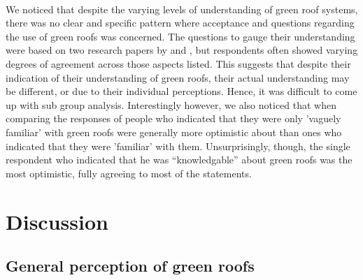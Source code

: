 \documentclass{article}
\begin{document}
\begin{multicols}{2}
  \paragraph{} We noticed that despite the varying levels of understanding
  of green roof systems, there was no clear and specific pattern
  where acceptance and questions regarding the use of green roofs was
  concerned. The questions to gauge their understanding were based on
  two research papers by \cite{HKGreenRoofGL} and \cite{energeff},
  but respondents often showed varying degrees of agreement across
  those aspects listed. This suggests that despite their indication of
  their understanding of green roofs, their actual understanding may
  be different, or due to their individual perceptions. Hence, it was
  difficult to come up with sub group analysis.  Interestingly however, we
  also noticed that when comparing the responses of people who indicated
  that they were only 'vaguely familiar' with green roofs were generally
  more optimistic about than ones who indicated that they were 'familiar'
  with them. Unsurprisingly, though, the single respondent who indicated
  that he was ``knowledgable'' about green roofs was the most optimistic,
  fully agreeing to most of the statements.



  \section{Discussion}
  \subsection{General perception of green roofs}

\end{multicols}
\end{document}
